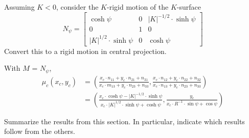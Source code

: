 \documentclass[newpage,hints,handout,12pt,nooutcomes,noauthor]{ximera}
\begin{document}
  
\begin{problem}
  Assuming $K < 0$, consider the $K$-rigid motion of the $K$-surface
  \[
  N_\psi=
  \begin{bmatrix}
    \cosh\psi & 0 & |K|^{-1/2}\cdot\sinh\psi\\
    0 & 1 & 0\\
    |K|^{1/2}\cdot\sinh\psi & 0 & \cosh\psi
  \end{bmatrix}
  \]
  Convert this to a rigid motion in central projection.
  
    \begin{freeResponse}
   With $M$ = $N_\psi$,
  \begin{align*}
  \mu_c(x_c,y_c) &= \left( \frac{x_c\cdot n_{11} + y_c\cdot n_{21} + n_{31}}{x_c\cdot m_{13} + y_c\cdot n_{23} + n_{33}},
    \frac{x_c\cdot n_{12} + y_c\cdot n_{22} + n_{32}}{x_c\cdot n_{13} + y_c\cdot n_{23} + n_{33}} \right) \\
    &= \left( \frac{x_c\cdot \cosh\psi -  |K|^{-1/2}\cdot \sinh\psi}{x_c \cdot |K|^{1/2}\cdot \sinh\psi + \cosh\psi},
    \frac{y_c}{x_c\cdot R^{-1} \cdot \sin\psi + \cos\psi} \right) 
  \end{align*}
  \end{freeResponse}
\end{problem}


\begin{problem}
Summarize the results from this section. In particular, indicate which
results follow from the others.
\begin{freeResponse}
\end{freeResponse}
\end{problem}
\end{document}
